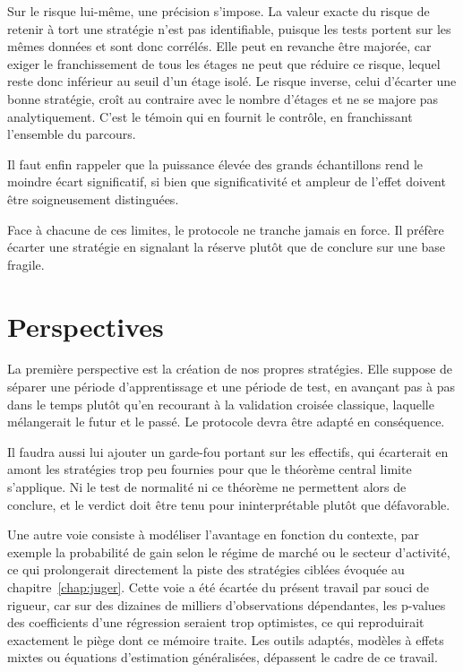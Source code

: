 Sur le risque lui-même, une précision s'impose. La valeur exacte du risque de
retenir à tort une stratégie n'est pas identifiable, puisque les tests portent
sur les mêmes données et sont donc corrélés. Elle peut en revanche être
majorée, car exiger le franchissement de tous les étages ne peut que réduire
ce risque, lequel reste donc inférieur au seuil d'un étage isolé. Le risque
inverse, celui d'écarter une bonne stratégie, croît au contraire avec le
nombre d'étages et ne se majore pas analytiquement. C'est le témoin qui en
fournit le contrôle, en franchissant l'ensemble du parcours.

Il faut enfin rappeler que la puissance élevée des grands échantillons rend le
moindre écart significatif, si bien que significativité et ampleur de l'effet
doivent être soigneusement distinguées.

Face à chacune de ces limites, le protocole ne tranche jamais en force. Il
préfère écarter une stratégie en signalant la réserve plutôt que de conclure
sur une base fragile.

\section{Perspectives}
\label{sec:perspectives}


La première perspective est la création de nos propres stratégies. Elle
suppose de séparer une période d'apprentissage et une période de test, en
avançant pas à pas dans le temps plutôt qu'en recourant à la validation
croisée classique, laquelle mélangerait le futur et le passé. Le protocole
devra être adapté en conséquence.

Il faudra aussi lui ajouter un garde-fou portant sur les effectifs, qui
écarterait en amont les stratégies trop peu fournies pour que le théorème
central limite s'applique. Ni le test de normalité ni ce théorème ne
permettent alors de conclure, et le verdict doit être tenu pour
ininterprétable plutôt que défavorable.

Une autre voie consiste à modéliser l'avantage en fonction du contexte, par
exemple la probabilité de gain selon le régime de marché ou le secteur
d'activité, ce qui prolongerait directement la piste des stratégies ciblées
évoquée au chapitre~\ref{chap:juger}. Cette voie a été écartée du présent
travail par souci de rigueur, car sur des dizaines de milliers d'observations
dépendantes, les p-values des coefficients d'une régression seraient trop
optimistes, ce qui reproduirait exactement le piège dont ce mémoire traite.
Les outils adaptés, modèles à effets mixtes ou équations d'estimation
généralisées, dépassent le cadre de ce travail.

